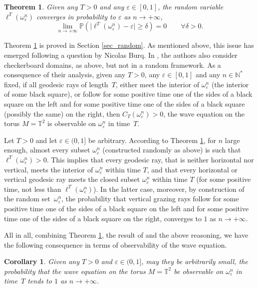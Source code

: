 \documentclass[10pt]{amsart}
\def\N{\mathbb{N}}
\newtheorem{theorem}{Theorem}
\newtheorem{corollary}{Corollary}
\theoremstyle{definition}
\begin{document}
\begin{theorem}\label{thm_random}
Given any $T>0$ and any $ \varepsilon \in [0, 1]$, the random variable $\ell^T(\omega_\varepsilon^n)$ converges in probability to $\varepsilon$ as $n\to +\infty$, \ie
\[
\lim_{n\to +\infty}\mathbb{P}\left(\vert\ell^T(\omega_\varepsilon^n) - \varepsilon \vert \geq \delta\right) = 0 \qquad \forall \delta>0.
\]
\end{theorem}


Theorem \ref{thm_random} is proved in Section \ref{sec_random}. As mentioned above, this issue has emerged following a question by Nicolas Burq.
In \cite{Burq2017,BurqGerard2018}, the authors also consider checkerboard domains, as above, but not in a random framework. As a consequence of their analysis, given any $T>0$, any $\varepsilon\in[0,1]$ and any $n\in\N^*$ fixed, if all geodesic rays of length~$T$, either meet the interior of $\omega_\varepsilon^n$ (\ie the interior of some black square), or follow for some positive time one of the sides of a black square on the left and for some positive time one of the sides of a black square (possibly the same) on the right, then $C_T(\omega_\varepsilon^n)>0$, \ie the wave equation on the torus $M=\mathbb{T}^2$ is observable on $\omega_\varepsilon^n$ in time~$T$.

Let $T>0$ and let $\varepsilon \in(0,1]$ be arbitrary. According to Theorem \ref{thm_random}, for $n$ large enough, almost every subset $\omega_\varepsilon^n$ (constructed randomly as above) is such that $\ell^T(\omega_\varepsilon^n)>0$. This implies that every geodesic ray, that is neither horizontal nor vertical, meets the interior of $\omega_\varepsilon^n$ within time $T$, and that every horizontal or vertical geodesic ray meets the closed subset $\omega_\varepsilon^n$ within time $T$ (for some positive time, not less than $\ell^T(\omega_\varepsilon^n)$). In the latter case, moreover, by construction of the random set~$\omega_\varepsilon^n$, the probability that vertical grazing rays follow for some positive time one of the sides of a black square on the left and for some positive time one of the sides of a black square on the right, converges to $1$ as $n\rightarrow +\infty$.

All in all, combining Theorem \ref{thm_random}, the result of \cite{Burq2017,BurqGerard2018} and the above reasoning, we have the following consequence in terms of observability of the wave equation.

\begin{corollary}
Given any $T>0$ and $\varepsilon \in(0,1]$, may they be arbitrarily small, the probability that the wave equation on the torus $M=\mathbb{T}^2$ be observable on $\omega_\varepsilon^n$ in time~$T$ tends to $1$ as $n\rightarrow+\infty$.
\end{corollary}
\end{document}
